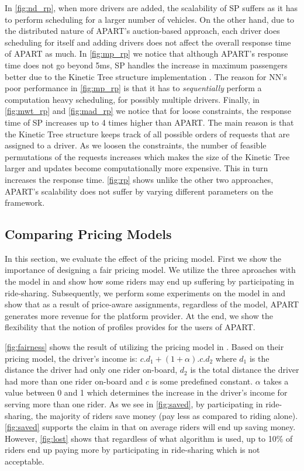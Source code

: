 In \cref{fig:nd_rp}, when more drivers are added, the scalability of SP suffers as it has to perform scheduling for a larger number of vehicles. On the other hand, due to the distributed nature of APART's auction-based approach, each driver does scheduling for itself and adding drivers does not affect the overall response time of APART as much. In \cref{fig:mp_rp} we notice that although APART's response time does not go beyond 5ms, SP handles the increase in maximum passengers better due to the Kinetic Tree structure implementation \cite{Huang14}. The reason for NN's poor performance in \cref{fig:mp_rp} is that it has to \textit{sequentially} perform a computation heavy scheduling, for possibly multiple drivers. Finally, in \cref{fig:mwt_rp} and \cref{fig:mad_rp} we notice that for loose constraints, the response time of SP increases up to 4 times higher than APART. The main reason is that the Kinetic Tree structure keeps track of all possible orders of requests that are assigned to a driver. As we loosen the constraints, the number of feasible permutations of the requests increases which makes the size of the Kinetic Tree larger and updates become computationally more expensive. This in turn increases the response time. \cref{fig:rp} shows unlike the other two approaches, APART's scalability does not suffer by varying different parameters on the framework.

\subsection{Comparing Pricing Models}
\label{subsec:pricingexp}

In this section, we evaluate the effect of the pricing model. First we show the importance of designing a fair pricing model. We utilize the three aproaches with the model in \cite{Ma13} and show how some riders may end up suffering by participating in ride-sharing. Subsequently, we perform some experiments on the model in \cite{Ma15} and show that as a result of price-aware assignments, regardless of the model, APART generates more revenue for the platform provider. At the end, we show the flexibility that the notion of profiles provides for the users of APART. 

\cref{fig:fairness} shows the result of utilizing the pricing model in \cite{Ma13}. Based on their pricing model, the driver's income is: $c.d_1 + (1+\alpha).c.d_2$ where $d_1$ is the distance the driver had only one rider on-board, $d_2$ is the total distance the driver had more than one rider on-board and $c$ is some predefined constant. $\alpha$ takes a value between 0 and 1 which determines the increase in the driver's income for serving more than one rider. As we see in \cref{fig:saved}, by participating in ride-sharing, the majority of riders save money (pay less as compared to riding alone). \cref{fig:saved} supports the claim in \cite{Ma13} that on average riders will end up saving money. However, \cref{fig:lost} shows that regardless of what algorithm is used, up to 10\% of riders end up paying more by participating in ride-sharing which is not acceptable. 

